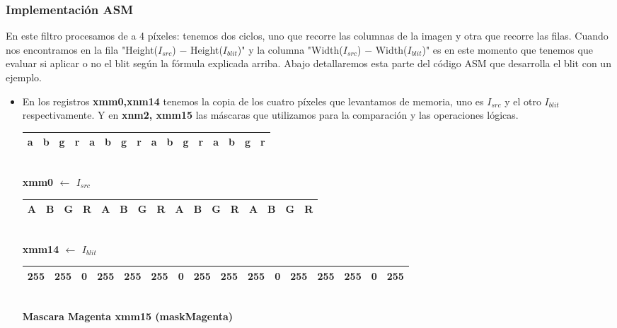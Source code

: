 \subsubsection{Implementación ASM}

En este filtro procesamos de a 4 píxeles: tenemos dos ciclos, uno que recorre las columnas de la imagen y otra que recorre las filas. Cuando nos encontramos en la fila "Height($I_{src}$) $-$ Height($I_{blit}$)" y la columna "Width($I_{src}$) $-$ Width($I_{blit}$)" es en este momento que tenemos que evaluar si aplicar o no el blit según la fórmula explicada arriba. Abajo detallaremos esta parte del código ASM que desarrolla el blit con un ejemplo.	

\begin{itemize}

	\item En los registros \textbf{xmm0,xnm14} tenemos la copia de los cuatro píxeles que levantamos de memoria, uno es $I_{src}$ y el otro $I_{blit}$ respectivamente.
			Y en \textbf{xnm2, xmm15} las máscaras que utilizamos para la comparación y las operaciones lógicas.

		\begin{center}
		   \begin{tabular}{| c | c | c | c || c | c | c | c || c | c | c | c || c | c | c | c |}
			 \hline
			 a & b & g & r & a & b & g & r & a & b & g & r & a & b & g & r \\ \hline
		   \end{tabular}
		   \\ \textbf{xmm0 $\gets$ $I_{src}$ }
		\end{center}

		\begin{center}
		   \begin{tabular}{| c | c | c | c || c | c | c | c || c | c | c | c || c | c | c | c |}
			 \hline
			 A & B & G & R & A & B & G & R & A & B & G & R & A & B & G & R \\ \hline
		   \end{tabular}
		   \\ \textbf{xmm14 $\gets$ $I_{blit}$ }
		\end{center}
		
		 
		\begin{center}
		   \begin{tabular}{| c | c | c | c || c | c | c | c || c | c | c | c || c | c | c | c |}
			 \hline
			 255 & 255 & 0 & 255 & 255 & 255 & 0 & 255 & 255 & 255 & 0 & 255 & 255 & 255 & 0 & 255 \\ \hline
		   \end{tabular}
		   \\  \textbf{Mascara Magenta xmm15 (maskMagenta)}
		\end{center}


\end{itemize}
